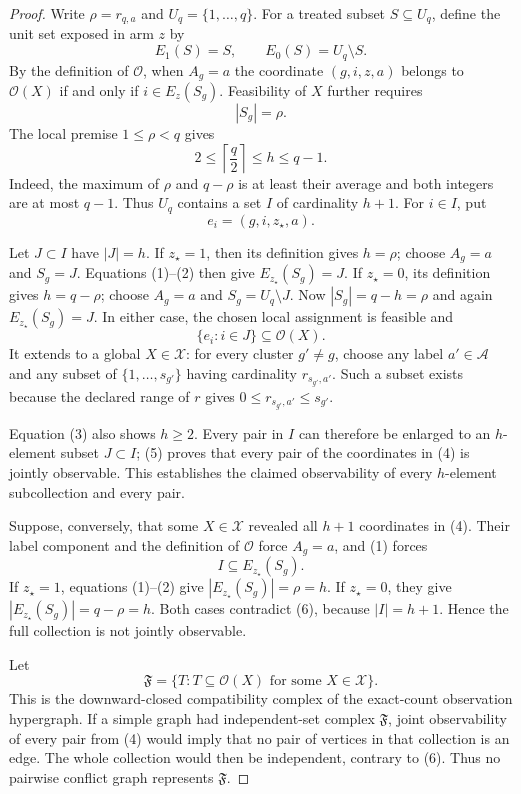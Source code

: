 \documentclass{article}
\begin{document}
\begin{proof}
Write \(\rho=r_{q,a}\) and \(U_q=\{1,\ldots,q\}\).  For a treated subset \(S\subseteq U_q\), define the unit set exposed in arm \(z\) by
\[
 E_1(S)=S,
 \qquad
 E_0(S)=U_q\setminus S.
 \tag{1}
\]
By the definition of \(\mathcal O\), when \(A_g=a\) the coordinate \((g,i,z,a)\) belongs to \(\mathcal O(X)\) if and only if \(i\in E_z(S_g)\).  Feasibility of \(X\) further requires
\[
 |S_g|=\rho.
 \tag{2}
\]
The local premise \(1\le\rho<q\) gives
\[
 2\le \left\lceil\frac q2\right\rceil\le h\le q-1.
 \tag{3}
\]
Indeed, the maximum of \(\rho\) and \(q-\rho\) is at least their average and both integers are at most \(q-1\).  Thus \(U_q\) contains a set \(I\) of cardinality \(h+1\).  For \(i\in I\), put
\[
 e_i=(g,i,z_\star,a).
 \tag{4}
\]

Let \(J\subset I\) have \(|J|=h\).  If \(z_\star=1\), then its definition gives \(h=\rho\); choose \(A_g=a\) and \(S_g=J\).  Equations (1)--(2) then give \(E_{z_\star}(S_g)=J\).  If \(z_\star=0\), its definition gives \(h=q-\rho\); choose \(A_g=a\) and \(S_g=U_q\setminus J\).  Now \(|S_g|=q-h=\rho\) and again \(E_{z_\star}(S_g)=J\).  In either case, the chosen local assignment is feasible and
\[
 \{e_i:i\in J\}\subseteq\mathcal O(X).
 \tag{5}
\]
It extends to a global \(X\in\mathcal X\): for every cluster \(g'\ne g\), choose any label \(a'\in\mathcal A\) and any subset of \(\{1,\ldots,s_{g'}\}\) having cardinality \(r_{s_{g'},a'}\).  Such a subset exists because the declared range of \(r\) gives
\(0\le r_{s_{g'},a'}\le s_{g'}\).

Equation (3) also shows \(h\ge2\).  Every pair in \(I\) can therefore be enlarged to an \(h\)-element subset \(J\subset I\); (5) proves that every pair of the coordinates in (4) is jointly observable.  This establishes the claimed observability of every \(h\)-element subcollection and every pair.

Suppose, conversely, that some \(X\in\mathcal X\) revealed all \(h+1\) coordinates in (4).  Their label component and the definition of \(\mathcal O\) force \(A_g=a\), and (1) forces
\[
 I\subseteq E_{z_\star}(S_g).
 \tag{6}
\]
If \(z_\star=1\), equations (1)--(2) give \(|E_{z_\star}(S_g)|=\rho=h\).  If \(z_\star=0\), they give \(|E_{z_\star}(S_g)|=q-\rho=h\).  Both cases contradict (6), because \(|I|=h+1\).  Hence the full collection is not jointly observable.

Let
\[
 \mathfrak F=\bigl\{T:T\subseteq\mathcal O(X)
                  \text{ for some }X\in\mathcal X\bigr\}.
 \tag{7}
\]
This is the downward-closed compatibility complex of the exact-count observation hypergraph.  If a simple graph had independent-set complex \(\mathfrak F\), joint observability of every pair from (4) would imply that no pair of vertices in that collection is an edge.  The whole collection would then be independent, contrary to (6).  Thus no pairwise conflict graph represents \(\mathfrak F\).


\end{proof}
\end{document}

